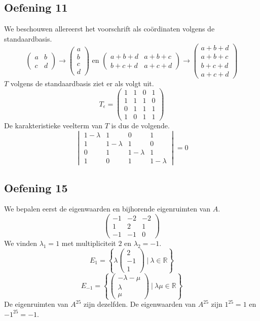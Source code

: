 \documentclass[lineaire_algebra_oplossingen.tex]{subfiles}
\begin{document}
\subsection{Oefening 11}
We beschouwen allereerst het voorschrift als co\"ordinaten volgens de standaardbasis.
\[
\begin{pmatrix}
a & b\\
c & d
\end{pmatrix}
\rightarrow
\begin{pmatrix}
a \\ b \\ c \\ d
\end{pmatrix}
\text{ en }
\begin{pmatrix}
a+b+d & a+b+c\\
b+c+d & a+c+d
\end{pmatrix}
\rightarrow
\begin{pmatrix}
a+b+d \\ a+b+c \\ b+c+d \\ a+c+d
\end{pmatrix}
\]
$T$ volgens de standaardbasis ziet er als volgt uit. 
\[
T_\epsilon =
\begin{pmatrix}
1 & 1 & 0 & 1\\
1 & 1 & 1 & 0\\
0 & 1 & 1 & 1\\
1 & 0 & 1 & 1
\end{pmatrix}
\]
De karakteristieke veelterm van $T$ is dus de volgende.
\[
\begin{vmatrix}
1-\lambda & 1 & 0 & 1\\
1 & 1-\lambda & 1 & 0\\
0 & 1 & 1-\lambda & 1\\
1 & 0 & 1 & 1-\lambda
\end{vmatrix}
= 0
\]

\subsection{Oefening 15}
We bepalen eerst de eigenwaarden en bijhorende eigenruimten van $A$.
\[
\begin{pmatrix}
-1 & -2 & -2\\
1 & 2 & 1\\
-1 & -1 & 0
\end{pmatrix}
\]
We vinden $\lambda_1 = 1$ met multipliciteit $2$ en $\lambda_2 = -1$.
\[
E_1 = 
\left\{
\lambda
\begin{pmatrix}
2\\-1\\1
\end{pmatrix}
\ |\ \lambda \in \mathbb{R}
\right\}
\]
\[
E_{-1} = 
\left\{
\begin{pmatrix}
-\lambda-\mu\\\lambda\\\mu
\end{pmatrix}
\ |\ \lambda\mu \in \mathbb{R}
\right\}
\]
De eigenruimten van $A^25$ zijn dezelfden. De eigenwaarden van $A^25$ zijn $1^25=1$ en $-1^25 = -1$.
\end{document}
